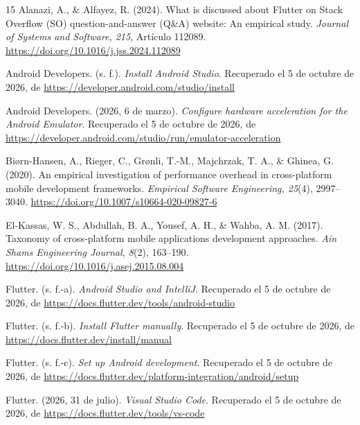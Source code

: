 \documentclass[12pt,letterpaper]{article}
\begin{document}
\begin{thebibliography}{15}
Alanazi, A., \& Alfayez, R. (2024). What is discussed about Flutter on Stack Overflow (SO) question-and-answer (Q\&A) website: An empirical study. \textit{Journal of Systems and Software, 215}, Artículo 112089. \url{https://doi.org/10.1016/j.jss.2024.112089}

Android Developers. (s. f.). \textit{Install Android Studio}. Recuperado el 5 de octubre de 2026, de \url{https://developer.android.com/studio/install}

Android Developers. (2026, 6 de marzo). \textit{Configure hardware acceleration for the Android Emulator}. Recuperado el 5 de octubre de 2026, de \url{https://developer.android.com/studio/run/emulator-acceleration}

Bi{\o}rn-Hansen, A., Rieger, C., Gr{\o}nli, T.-M., Majchrzak, T. A., \& Ghinea, G. (2020). An empirical investigation of performance overhead in cross-platform mobile development frameworks. \textit{Empirical Software Engineering, 25}(4), 2997--3040. \url{https://doi.org/10.1007/s10664-020-09827-6}

El-Kassas, W. S., Abdullah, B. A., Yousef, A. H., \& Wahba, A. M. (2017). Taxonomy of cross-platform mobile applications development approaches. \textit{Ain Shams Engineering Journal, 8}(2), 163--190. \url{https://doi.org/10.1016/j.asej.2015.08.004}

Flutter. (s. f.-a). \textit{Android Studio and IntelliJ}. Recuperado el 5 de octubre de 2026, de \url{https://docs.flutter.dev/tools/android-studio}

Flutter. (s. f.-b). \textit{Install Flutter manually}. Recuperado el 5 de octubre de 2026, de \url{https://docs.flutter.dev/install/manual}

Flutter. (s. f.-c). \textit{Set up Android development}. Recuperado el 5 de octubre de 2026, de \url{https://docs.flutter.dev/platform-integration/android/setup}

Flutter. (2026, 31 de julio). \textit{Visual Studio Code}. Recuperado el 5 de octubre de 2026, de \url{https://docs.flutter.dev/tools/vs-code}


\end{thebibliography}
\end{document}
